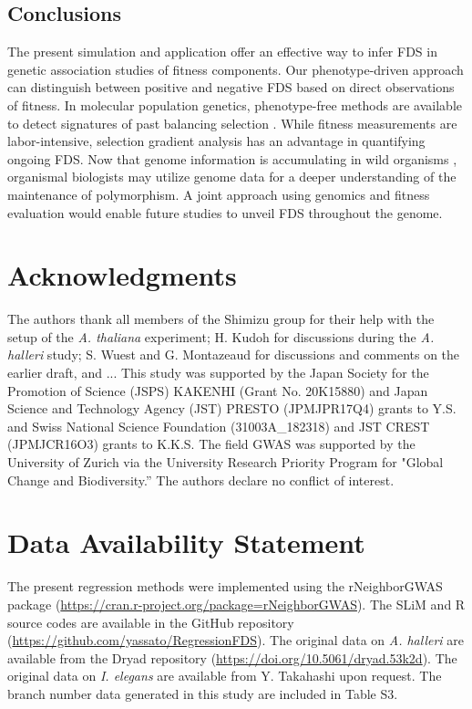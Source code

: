 \documentclass[12pt,]{article}
\begin{document}
\subsection{Conclusions}
The present simulation and application offer an effective way to infer FDS in genetic association studies of fitness components. Our phenotype-driven approach can distinguish between positive and negative FDS based on direct observations of fitness. In molecular population genetics, phenotype-free methods are available to detect signatures of past balancing selection \citep{siewert_detecting_2017}. While fitness measurements are labor-intensive, selection gradient analysis has an advantage in quantifying ongoing FDS. Now that genome information is accumulating in wild organisms \citep{lewin2018earth}, organismal biologists may utilize genome data for a deeper understanding of the maintenance of polymorphism. A joint approach using genomics and fitness evaluation would enable future studies to unveil FDS throughout the genome.

\section*{Acknowledgments}
The authors thank all members of the Shimizu group for their help with the setup of the \textit{A. thaliana} experiment; H. Kudoh for discussions during the \textit{A. halleri} study; S. Wuest and G. Montazeaud for discussions and comments on the earlier draft, and ... This study was supported by the Japan Society for the Promotion of Science (JSPS) KAKENHI (Grant No. 20K15880) and Japan Science and Technology Agency (JST) PRESTO (JPMJPR17Q4) grants to Y.S. and Swiss National Science Foundation (31003A\_182318) and JST CREST (JPMJCR16O3) grants to K.K.S. The field GWAS was supported by the University of Zurich via the University Research Priority Program for "Global Change and Biodiversity.” The authors declare no conflict of interest.

\section*{Data Availability Statement}
The present regression methods were implemented using the rNeighborGWAS package (\url{https://cran.r-project.org/package=rNeighborGWAS}). The SLiM and R source codes are available in the GitHub repository (\url{https://github.com/yassato/RegressionFDS}). The original data on \textit{A. halleri} are available from the Dryad repository (\url{https://doi.org/10.5061/dryad.53k2d}). The original data on \textit{I. elegans} are available from Y. Takahashi upon request. The branch number data generated in this study are included in Table S3.
\end{document}
